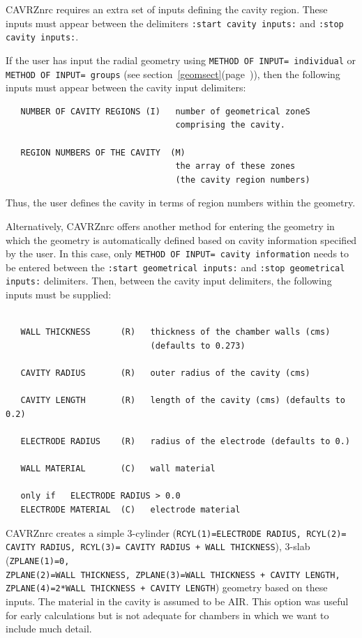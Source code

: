 \documentclass[12pt,twoside]{article}  %
\newcommand{\lpage}[1]{(page~\pageref{#1})}
\begin{document}
CAVRZnrc requires an extra set of
inputs defining the cavity region.  These inputs must appear between the
delimiters {\tt :start cavity inputs:} and {\tt :stop cavity inputs:}.

If the user has input the radial geometry using 
{\tt METHOD OF INPUT= individual} or {\tt METHOD OF INPUT= groups} 
(see section~\ref{geomsect}\lpage{geomsect}), then the following inputs must 
appear between the cavity input delimiters:
\begin{verbatim}
   NUMBER OF CAVITY REGIONS (I)   number of geometrical zoneS
                                  comprising the cavity.

   REGION NUMBERS OF THE CAVITY  (M)
                                  the array of these zones
                                  (the cavity region numbers)
\end{verbatim}
Thus, the user defines the cavity in terms of region numbers within the
geometry.  

Alternatively, CAVRZnrc offers another method for entering the geometry
in which the geometry is
automatically defined based on cavity information specified by the user.
In this case, only {\tt METHOD OF INPUT= cavity information} needs to be
entered between the {\tt :start geometrical inputs:} and
{\tt :stop geometrical inputs:} delimiters.  Then, between the
cavity input delimiters, the following inputs must be supplied:

\begin{verbatim} 

   WALL THICKNESS      (R)   thickness of the chamber walls (cms)
                             (defaults to 0.273)

   CAVITY RADIUS       (R)   outer radius of the cavity (cms)

   CAVITY LENGTH       (R)   length of the cavity (cms) (defaults to 0.2)

   ELECTRODE RADIUS    (R)   radius of the electrode (defaults to 0.)

   WALL MATERIAL       (C)   wall material 

   only if   ELECTRODE RADIUS > 0.0
   ELECTRODE MATERIAL  (C)   electrode material
\end{verbatim}   
CAVRZnrc creates a simple 3-cylinder
({\tt RCYL(1)=ELECTRODE RADIUS, RCYL(2)=\\CAVITY RADIUS, RCYL(3)=
CAVITY RADIUS + WALL THICKNESS}), 3-slab ({\tt ZPLANE(1)=0,\\
ZPLANE(2)=WALL THICKNESS, ZPLANE(3)=WALL THICKNESS + CAVITY LENGTH,\\
ZPLANE(4)=2*WALL THICKNESS + CAVITY LENGTH}) geometry based on these
inputs.  The material in the cavity is assumed to be AIR.  This option was
useful for early calculations but is not adequate for chambers in which we
want to include much detail.
\end{document}

